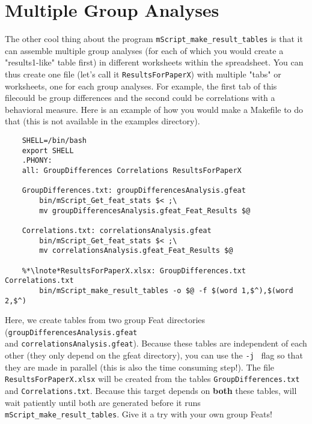 \section{Multiple Group Analyses} 

The other cool thing about the program \texttt{mScript_make_result_tables} is that it can assemble multiple group analyses (for each of which you would create a "results1-like" table first) in different worksheets within the spreadsheet. You can thus create one file (let's call it \texttt{ResultsForPaperX}) with multiple "tabs" or worksheets, one for each group analyses. For example, the first tab of this filecould be group differences and the second could be correlations with a behavioral measure. Here is an example of how you would make a Makefile to do that (this is not available in the examples directory). 

\begin{lstlisting}
	SHELL=/bin/bash
	export SHELL
	.PHONY: 
	all: GroupDifferences Correlations ResultsForPaperX
  
	GroupDifferences.txt: groupDifferencesAnalysis.gfeat
		bin/mScript_Get_feat_stats $< ;\
		mv groupDifferencesAnalysis.gfeat_Feat_Results $@
	
	Correlations.txt: correlationsAnalysis.gfeat
		bin/mScript_Get_feat_stats $< ;\
		mv correlationsAnalysis.gfeat_Feat_Results $@

	%*\lnote*ResultsForPaperX.xlsx: GroupDifferences.txt Correlations.txt
		bin/mScript_make_result_tables -o $@ -f $(word 1,$^),$(word 2,$^)

\end{lstlisting}

\noindent
Here, we create tables from two group Feat directories 
(\texttt{groupDifferencesAnalysis.gfeat} \\
and \texttt{correlationsAnalysis.gfeat}). 
Because these tables are independent of each other (they only depend on the gfeat directory), you can use the \texttt{-j } flag so that they are made in parallel (this is also the time consuming step!). 
\lnum{3} The file \texttt{ResultsForPaperX.xlsx} will be created from the tables \texttt{GroupDifferences.txt} and \texttt{Correlations.txt}. Because this target depends on \textbf{both} these tables, \maken{} will wait patiently until both are generated before it runs \texttt{mScript_make_result_tables}. Give it a try with your own group Feats!






